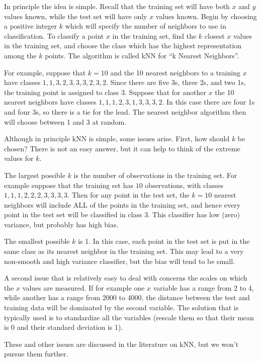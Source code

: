 \documentclass[
]{krantz}
\begin{document}
In principle the idea is simple. Recall that the training set will have both \(x\) and \(y\) values known, while the test set will have only \(x\) values known. Begin by choosing a positive integer \(k\) which will specify the number of neighbors to use in classification. To classify a point \(x\) in the training set, find the \(k\) closest \(x\) values in the training set, and choose the class which has the highest representation among the \(k\) points. The algorithm is called kNN for ``k Nearest Neighbors''.

For example, suppose that \(k=10\) and the 10 nearest neighbors to a training \(x\) have classes \(1, 1, 3, 2, 3, 3, 3, 2, 3, 2\). Since there are five 3s, three 2s, and two 1s, the training point is assigned to class 3. Suppose that for another \(x\) the 10 nearest neighbors have classes \(1,1,1,2,3,1,3,3,3,2\). In this case there are four 1s and four 3s, so there is a tie for the lead. The nearest neighbor algorithm then will choose between 1 and 3 at random.

Although in principle kNN is simple, some issues arise. First, how should \(k\) be chosen? There is not an easy answer, but it can help to think of the extreme values for \(k\).

The largest possible \(k\) is the number of observations in the training set. For example suppose that the training set has \(10\) observations, with classes \(1, 1, 1, 2, 2, 2, 3, 3, 3, 3\). Then for any point in the test set, the \(k=10\) nearest neighbors will include ALL of the points in the training set, and hence every point in the test set will be classified in class 3. This classifier has low (zero) variance, but probably has high bias.

The smallest possible \(k\) is 1. In this case, each point in the test set is put in the same class as its nearest neighbor in the training set. This may lead to a very non-smooth and high variance classifier, but the bias will tend to be small.

A second issue that is relatively easy to deal with concerns the scales on which the \(x\) values are measured. If for example one \(x\) variable has a range from 2 to 4, while another has a range from 2000 to 4000, the distance between the test and training data will be dominated by the second variable. The solution that is typically used is to standardize all the variables (rescale them so that their mean is 0 and their standard deviation is 1).

These and other issues are discussed in the literature on kNN, but we won't pursue them further.
\end{document}
